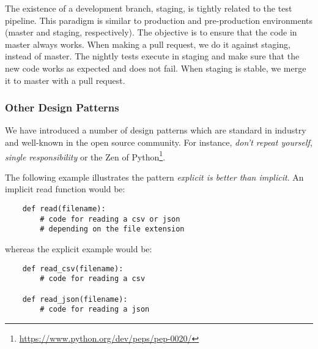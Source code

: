 The existence of a development branch, staging, is tightly related to the test pipeline. This paradigm is similar to
production and pre-production environments (master and staging, respectively).
The objective is to ensure that the code in master always works. When making a pull request, we 
do it against staging, instead of master. The nightly tests execute in staging and make sure that the new code 
works as expected and does not fail. When staging is stable, we merge it to master with a pull request.  


\subsubsection{Other Design Patterns}

We have introduced a number of design patterns which are standard in industry and well-known
in the open source community. For instance, \textit{don't repeat yourself}, \textit{single
responsibility} or the Zen of Python\footnote{\url{https://www.python.org/dev/peps/pep-0020/}}. 

The following example illustrates the pattern \textit{explicit is better than implicit}.
An implicit read function would be: 
\begin{verbatim}
    def read(filename):
        # code for reading a csv or json
        # depending on the file extension
\end{verbatim}

whereas the explicit example would be:
\begin{verbatim}
    def read_csv(filename):
        # code for reading a csv

    def read_json(filename):
        # code for reading a json
\end{verbatim}



